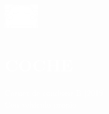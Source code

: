 \documentclass[../main.tex]{subfiles}
\begin{document}
\hspace*{0.2cm}
    \begin{minipage}[t]{2cm}
        \vspace*{0.9cm}\includegraphics[width=1.5cm]{assets/car.png}
    \end{minipage}
    \begin{minipage}[t]{5cm}
    
        \vspace*{0.75cm}
        \section*{\textcolor{white}{COCHE}}
        \vspace*{-0.25cm}
        \textcolor{white}{
            Carnet de conducir B [2019] \\
            Con vehículo propio
        }
    \end{minipage}
\end{document}
